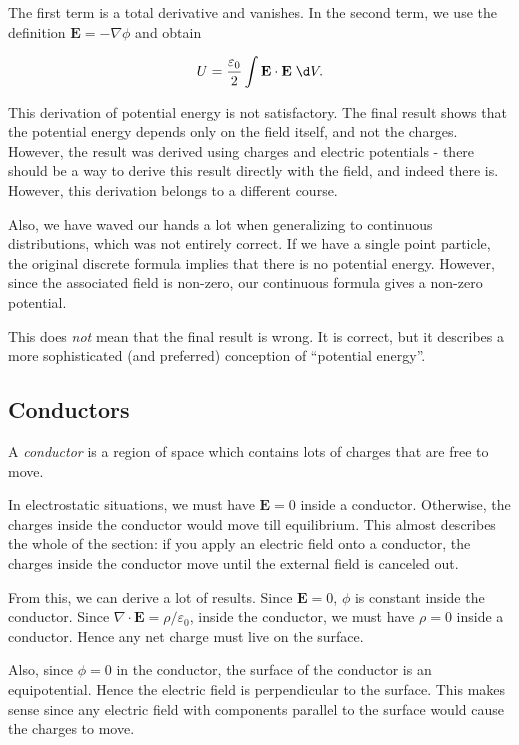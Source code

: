 \documentclass[a4paper]{article}
\begin{document}
The first term is a total derivative and vanishes. In the second term, we use the definition $\mathbf{E} = -\nabla \phi$ and obtain
\begin{prop}
  \[
    U = \frac{\varepsilon_0}{2}\int \mathbf{E}\cdot \mathbf{E} \;\d V.
  \]
\end{prop}
This derivation of potential energy is not satisfactory. The final result shows that the potential energy depends only on the field itself, and not the charges. However, the result was derived using charges and electric potentials - there should be a way to derive this result directly with the field, and indeed there is. However, this derivation belongs to a different course.

Also, we have waved our hands a lot when generalizing to continuous distributions, which was not entirely correct. If we have a single point particle, the original discrete formula implies that there is no potential energy. However, since the associated field is non-zero, our continuous formula gives a non-zero potential.

This does \emph{not} mean that the final result is wrong. It is correct, but it describes a more sophisticated (and preferred) conception of ``potential energy''.

\subsection{Conductors}
\begin{defi}[Conductor]
  A \emph{conductor} is a region of space which contains lots of charges that are free to move.
\end{defi}

In electrostatic situations, we must have $\mathbf{E} = 0$ inside a conductor. Otherwise, the charges inside the conductor would move till equilibrium. This almost describes the whole of the section: if you apply an electric field onto a conductor, the charges inside the conductor move until the external field is canceled out.

From this, we can derive a lot of results. Since $\mathbf{E} = 0$, $\phi$ is constant inside the conductor. Since $\nabla \cdot \mathbf{E} = \rho/\varepsilon_0$, inside the conductor, we must have $\rho = 0$ inside a conductor. Hence any net charge must live on the surface.

Also, since $\phi = 0$ in the conductor, the surface of the conductor is an equipotential. Hence the electric field is perpendicular to the surface. This makes sense since any electric field with components parallel to the surface would cause the charges to move.
\end{document}
